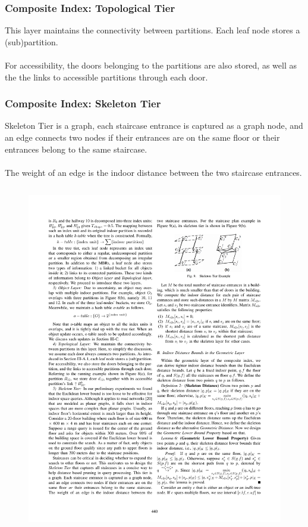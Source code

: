 
\begin{frame}
\frametitle{Composite Index: Topological Tier}

This layer maintains the connectivity between partitions. Each leaf node stores a (sub)partition.\\~\\

For accessibility, the doors belonging to the partitions are also stored, as well as the the links to accessible partitions through each door.

\end{frame}


\begin{frame}
\frametitle{Composite Index: Skeleton Tier}

Skeleton Tier is a graph, each staircase entrance is captured as a graph node, and an edge connects two nodes if their entrances are on the same floor or their entrances belong to the same staircase.\\~\\

The weight of an edge is the indoor distance between the two staircase entrances.

\vspace{-10pt}
\begin{columns}[c]

  \begin{figure}[tb]
    \includegraphics[width=\columnwidth]{figures/2-6/2-6-11.pdf}
  \end{figure}


\end{columns}
\end{frame}
